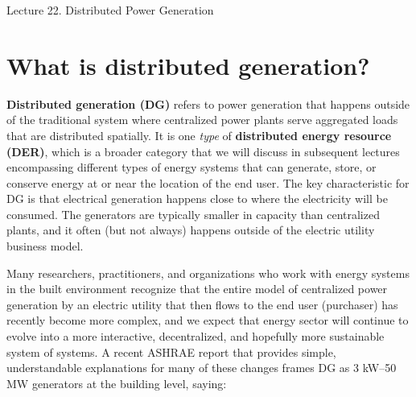 \documentclass[10pt]{article}
\begin{document}
   \noindent
   \begin{center}

   \hrulefill
   
   \vspace{5pt}
   
   \vspace{0pt}
   
   {\Large \hfill  Lecture 22. Distributed Power Generation
}
   \vspace{5pt}
   
  
   \hrulefill
   \end{center}

{}

\section{What is distributed generation?}

\textbf{Distributed generation (DG)} refers to power generation that happens outside of the traditional system where centralized power plants serve aggregated loads that are distributed spatially.  It is one \textit{type} of \textbf{distributed energy resource (DER)}, which is a broader category that we will discuss in subsequent lectures encompassing different types of energy systems that can generate, store, or conserve energy at or near the location of the end user. The key characteristic for DG is that electrical generation happens close to where the electricity will be consumed. The generators are typically smaller in capacity than centralized plants, and it often (but not always) happens outside of the electric utility business model.

Many researchers, practitioners, and organizations who work with energy systems in the built environment recognize that the entire model of centralized power generation by an electric utility that then flows to the end user (purchaser) has recently become more complex, and we expect that energy sector will continue to evolve into a more interactive, decentralized, and hopefully more sustainable system of systems. A recent ASHRAE report that provides simple, understandable explanations for many of these changes frames DG as 3 kW--50 MW generators at the building level, saying:
\end{document}
